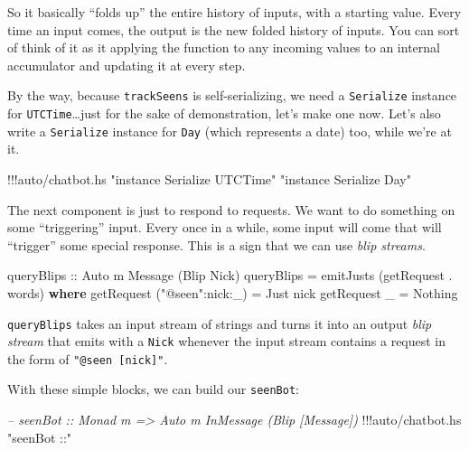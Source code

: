 \documentclass[]{article}
\newenvironment{Shaded}{}{}
\newcommand{\KeywordTok}[1]{\textcolor[rgb]{0.00,0.44,0.13}{\textbf{{#1}}}}
\newcommand{\DataTypeTok}[1]{\textcolor[rgb]{0.56,0.13,0.00}{{#1}}}
\newcommand{\StringTok}[1]{\textcolor[rgb]{0.25,0.44,0.63}{{#1}}}
\newcommand{\CommentTok}[1]{\textcolor[rgb]{0.38,0.63,0.69}{\textit{{#1}}}}
\newcommand{\OtherTok}[1]{\textcolor[rgb]{0.00,0.44,0.13}{{#1}}}
\newcommand{\FunctionTok}[1]{\textcolor[rgb]{0.02,0.16,0.49}{{#1}}}
\newcommand{\NormalTok}[1]{{#1}}
\begin{document}
So it basically ``folds up'' the entire history of inputs, with a
starting value. Every time an input comes, the output is the new folded
history of inputs. You can sort of think of it as it applying the
function to any incoming values to an internal accumulator and updating
it at every step.

By the way, because \texttt{trackSeens} is self-serializing, we need a
\texttt{Serialize} instance for \texttt{UTCTime}\ldots{}just for the
sake of demonstration, let's make one now. Let's also write a
\texttt{Serialize} instance for \texttt{Day} (which represents a date)
too, while we're at it.

\begin{Shaded}
\begin{Highlighting}[]
\FunctionTok{!!!}\NormalTok{auto}\FunctionTok{/}\NormalTok{chatbot}\FunctionTok{.}\NormalTok{hs }\StringTok{"instance Serialize UTCTime"} \StringTok{"instance Serialize Day"}
\end{Highlighting}
\end{Shaded}

The next component is just to respond to requests. We want to do
something on some ``triggering'' input. Every once in a while, some
input will come that will ``trigger'' some special response. This is a
sign that we can use \emph{blip streams}.

\begin{Shaded}
\begin{Highlighting}[]
\OtherTok{queryBlips ::} \DataTypeTok{Auto} \NormalTok{m }\DataTypeTok{Message} \NormalTok{(}\DataTypeTok{Blip} \DataTypeTok{Nick}\NormalTok{)}
\NormalTok{queryBlips }\FunctionTok{=} \NormalTok{emitJusts (getRequest }\FunctionTok{.} \NormalTok{words)}
  \KeywordTok{where}
    \NormalTok{getRequest (}\StringTok{"@seen"}\FunctionTok{:}\NormalTok{nick}\FunctionTok{:}\NormalTok{_) }\FunctionTok{=} \DataTypeTok{Just} \NormalTok{nick}
    \NormalTok{getRequest _                }\FunctionTok{=} \DataTypeTok{Nothing}
\end{Highlighting}
\end{Shaded}

\texttt{queryBlips} takes an input stream of strings and turns it into
an output \emph{blip stream} that emits with a \texttt{Nick} whenever
the input stream contains a request in the form of
\texttt{"@seen\ {[}nick{]}"}.

With these simple blocks, we can build our \texttt{seenBot}:

\begin{Shaded}
\begin{Highlighting}[]
\CommentTok{-- seenBot :: Monad m => Auto m InMessage (Blip [Message])}
\FunctionTok{!!!}\NormalTok{auto}\FunctionTok{/}\NormalTok{chatbot}\FunctionTok{.}\NormalTok{hs }\StringTok{"seenBot ::"}
\end{Highlighting}
\end{Shaded}
\end{document}
